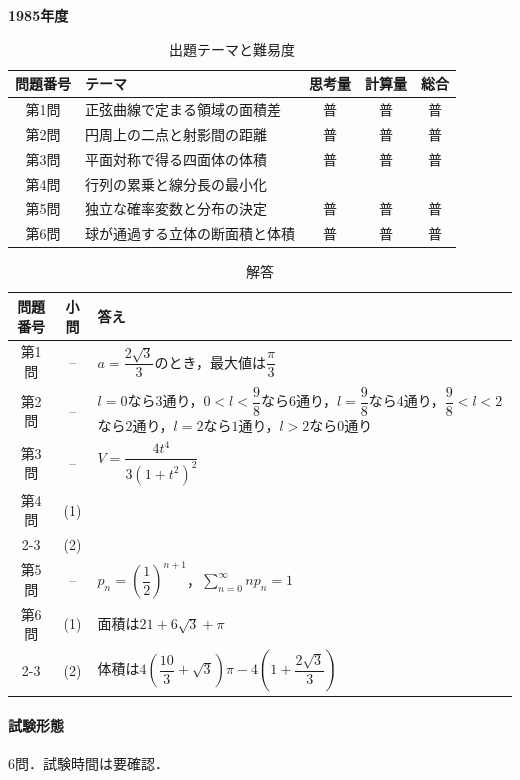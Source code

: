 \documentclass[../../main.tex]{subfiles}
\begin{document}
\begin{center}
  {\fontsize{48pt}{58pt}\selectfont \textbf{1985}\normalsize\textbf{年度}}
\end{center}

\begin{table}[htb]
  \centering
  \caption{出題テーマと難易度}
  \begin{tabular}{|c|p{6.2cm}|c|c|c|}
    \hline
    \textbf{問題番号} & \textbf{テーマ} & \textbf{思考量} & \textbf{計算量} & \textbf{総合} \\
    \hline
    第1問 & 正弦曲線で定まる領域の面積差 & 普 & 普 & 普 \\
    \hline
    第2問 & 円周上の二点と射影間の距離 & 普 & 普 & 普 \\
    \hline
    第3問 & 平面対称で得る四面体の体積 & 普 & 普 & 普 \\
    \hline
    第4問 & 行列の累乗と線分長の最小化 &  &  &  \\
    \hline
    第5問 & 独立な確率変数と分布の決定 & 普 & 普 & 普 \\
    \hline
    第6問 & 球が通過する立体の断面積と体積 & 普 & 普 & 普 \\
    \hline
  \end{tabular}
\end{table}

\begin{table}[htb]
  \centering
  \caption{解答}
  \renewcommand{\arraystretch}{1.4}
  \begin{tabular}{|c|c|p{9cm}|}
    \hline
    \textbf{問題番号} & \textbf{小問} & \textbf{答え} \\
    \hline
    第1問 & -- & $a=\dfrac{2\sqrt{3}}{3}$のとき，最大値は$\dfrac{\pi}{3}$ \\
    \hline
    第2問 & -- & $l=0$なら$3$通り，$0<l<\dfrac{9}{8}$なら$6$通り，$l=\dfrac{9}{8}$なら$4$通り，$\dfrac{9}{8}<l<2$なら$2$通り，$l=2$なら$1$通り，$l>2$なら$0$通り \\
    \hline
    第3問 & -- & $V=\dfrac{4t^4}{3(1+t^2)^2}$ \\
    \hline
    第4問 & (1) & \\
    \cline{2-3}
    & (2) & \\
    \hline
    第5問 & -- & $p_n=\left(\dfrac{1}{2}\right)^{n+1}$，$\displaystyle\sum_{n=0}^{\infty}np_n=1$ \\
    \hline
    第6問 & (1) & 面積は$21+6\sqrt{3}+\pi$ \\
    \cline{2-3}
    & (2) & 体積は$4\left(\dfrac{10}{3}+\sqrt{3}\right)\pi-4\left(1+\dfrac{2\sqrt{3}}{3}\right)$ \\
    \hline
  \end{tabular}
\end{table}

\paragraph{試験形態}
6問．試験時間は要確認．
\end{document}
